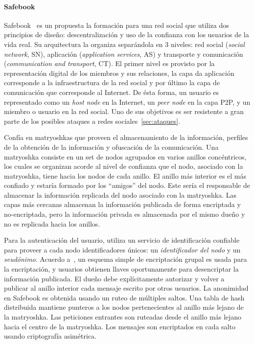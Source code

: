 \paragraph{Safebook}
Safebook~\cite{conf_wowmom_CutilloMO11} es un propuesta la formación para una
red social que utiliza dos principios de diseño: descentralización y uso de la
confianza con los usuarios de la vida real. Su arquitectura la organiza
separándola  en 3 niveles: red social (\textit{social network}, SN), aplicación
(\textit{application services}, AS) y transporte y comunicación
(\textit{communication and transport}, CT). El primer nivel es provisto por la
representación digital de los miembros y sus relaciones, la capa da aplicación
corresponde a la infraestructura de la red social y por último la capa de
comunicación que corresponde al Internet. 
De ésta forma, un usuario es representado como un \textit{host node} en la
Internet, un \textit{peer node} en la capa P2P, y un miembro o usuario en la
red social.
Uno de sus objetivos es ser resistente a gran parte de los posibles ataques a
redes sociales~\ref{sec:ataques}.

 Confía en matryoshkas que proveen el almacenamiento de la información, perfiles de la obtención de la información
y ofuscación de la comunicación. Una matryoshka consiste en un set de nodos
agrupados en varios anillos concéntricos, los cuales se organizan acorde al nivel de confianza que el
nodo, asociado con la matryoshka, tiene hacia los nodos de cada anillo. El
anillo más interior es el más confiado y estaría formado por los ``amigos'' del
nodo. Este sería el responsable  de almacenar la información replicada del nodo
asociado con la matryoshka. Las capas más cercanas almacenan la información
publicada de forma encriptada y no-encriptada, pero la información privada es
almacenada por el mismo dueño y no es replicada hacia los anillos. 

Para la autenticación del usuario, utiliza un servicio de identificación
confiable para proveer a cada nodo identificadores únicos: un \textit{identificador del
nodo} y un \textit{seudónimo}.
Acuerdo a~\cite{springerlink_10.1007_978-3-642-14282-6_7}, un esquema simple de encriptación grupal es usada para la
encriptación, y usuarios obtienen llaves oportunamente para desencriptar la
información publicada. El dueño debe explícitamente autorizar y volver a publicar al
anillo interior cada mensaje escrito por otros usuarios.
La anonimidad en Safebook es obtenida usando un ruteo de múltiples saltos. Una
tabla de hash distribuida mantiene punteros a los nodos pertenecientes al
anillo más lejano de la matryoshka. Las peticiones entrantes son ruteadas desde
el anillo más lejano hacia el centro de la matryoshka. Los mensajes son
encriptados en cada salto usando criptografía asimétrica.

